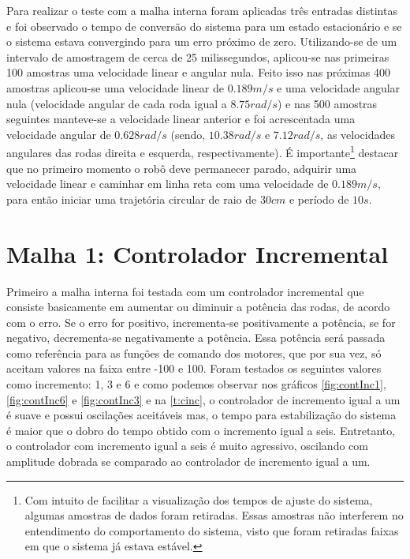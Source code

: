 Para realizar o teste com a malha interna foram aplicadas três entradas distintas e foi observado o tempo de conversão do sistema para um estado estacionário e se o sistema estava convergindo para um erro próximo de zero. Utilizando-se de um intervalo de amostragem de cerca de 25 milissegundos, aplicou-se nas primeiras 100 amostras uma velocidade linear e angular nula. Feito isso nas próximas 400 amostras aplicou-se uma velocidade linear de $0.189 m/s$ e uma velocidade angular nula (velocidade angular de cada roda igual a $8.75 rad/s$) e nas 500 amostras seguintes manteve-se a velocidade linear anterior e foi acrescentada uma velocidade angular de $0.628 rad/s$ (sendo, $10.38 rad/s$ e $7.12 rad/s$, as velocidades angulares das rodas direita e esquerda, respectivamente). É importante\footnote{Com intuito de facilitar a visualização dos tempos de ajuste do sistema, algumas amostras de dados foram retiradas. Essas amostras não interferem no entendimento do comportamento do sistema, visto que foram retiradas faixas em que o sistema já estava estável.}  destacar que no primeiro momento o robô deve permanecer parado, adquirir uma velocidade linear e caminhar em linha reta com uma velocidade de $0.189 m/s$, para então iniciar uma trajetória circular de raio de $30 cm$ e período de $10 s$.

\section{Malha 1: Controlador Incremental}
\label{m1ContInc}

Primeiro a malha interna foi testada com um controlador incremental que consiste basicamente em aumentar ou diminuir a potência das rodas, de acordo com o erro. Se o erro for positivo, incrementa-se positivamente a potência, se for negativo, decrementa-se negativamente a potência. Essa potência será passada como referência para as funções de comando dos motores, que por sua vez, só aceitam valores na faixa entre -100 e 100.%
Foram testados os seguintes valores como incremento: 1, 3 e 6 e como podemos observar nos gráficos \ref{fig:contInc1},\ref{fig:contInc6} e \ref{fig:contInc3} e na \autoref{t:cinc}, o controlador de incremento igual a um é suave e possui oscilações aceitáveis mas, o tempo para estabilização do sistema é maior que o dobro do tempo obtido com o incremento igual a seis. Entretanto, o controlador com incremento igual a seis é muito agressivo, oscilando com amplitude dobrada se comparado ao controlador de incremento igual a um. 

